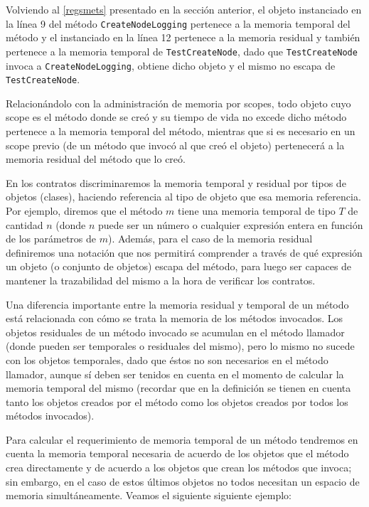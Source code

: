 \documentclass[12pt,a4paper]{article}
\newcommand\mono[1]{\texttt{#1}}
\begin{document}
			Volviendo al \autoref{regsmets} presentado en la sección anterior, el objeto instanciado en la línea 9 del método \mono{CreateNodeLogging} pertenece a la memoria temporal del método y el instanciado en la línea 12 pertenece a la memoria residual y también pertenece a la memoria temporal de \mono{TestCreateNode}, dado que \mono{TestCreateNode} invoca a \mono{CreateNodeLogging}, obtiene dicho objeto y el mismo no escapa de \mono{TestCreateNode}.

			Relacionándolo con la administración de memoria por scopes, todo objeto cuyo scope es el método donde se creó y su tiempo de vida no excede dicho método pertenece a la memoria temporal del método, mientras que si es necesario en un scope previo (de un método que invocó al que creó el objeto) pertenecerá a la memoria residual del método que lo creó.

			En los contratos discriminaremos la memoria temporal y residual por tipos de objetos (clases), haciendo referencia al tipo de objeto que esa memoria referencia. Por ejemplo, diremos que el método $m$ tiene una memoria temporal de tipo $T$ de cantidad $n$ (donde $n$ puede ser un número o cualquier expresión entera en función de los parámetros de $m$). Además, para el caso de la memoria residual definiremos una notación que nos permitirá comprender a través de qué expresión un objeto (o conjunto de objetos) escapa del método, para luego ser capaces de mantener la trazabilidad del mismo a la hora de verificar los contratos.

			Una diferencia importante entre la memoria residual y temporal de un método está relacionada con cómo se trata la memoria de los métodos invocados. Los objetos residuales de un método invocado se acumulan en el método llamador (donde pueden ser temporales o residuales del mismo), pero lo mismo no sucede con los objetos temporales, dado que éstos no son necesarios en el método llamador, aunque sí deben ser tenidos en cuenta en el momento de calcular la memoria temporal del mismo (recordar que en la definición se tienen en cuenta tanto los objetos creados por el método como los objetos creados por todos los métodos invocados).

			Para calcular el requerimiento de memoria temporal de un método tendremos en cuenta la memoria temporal necesaria de acuerdo de los objetos que el método crea directamente y de acuerdo a los objetos que crean los métodos que invoca; sin embargo, en el caso de estos últimos objetos no todos necesitan un espacio de memoria simultáneamente. Veamos el siguiente siguiente ejemplo:
\end{document}
